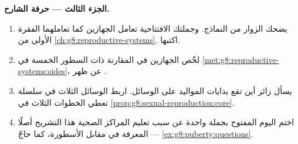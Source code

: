 \begin{problem}
\medskip\noindent\textbf{الجزء الثالث --- حرفة
الشارح.}
\begin{enumerate}[resume]
  \item يضحك الزوار من النماذج. وجملتك الافتتاحية تعامل
        الجهازين كما تعاملهما الفقرة الأولى من
        \cref{ch:g8:reproductive-systems}. اكتبها.
  \item لخّص الجهازين في المقارنة ذات السطور الخمسة في
        \cref{met:g8:reproductive-systems:sides}، عن ظهر
        .
  \item يسأل زائر أين تقع بدايات المواليد على الوسائل.
        اربط الوسائل الثلاث في سلسلة تعطي الخطوات الثلاث
        في \cref{prop:g8:sexual-reproduction:core}.
  \item اختم اليوم المفتوح بجملة واحدة عن سبب تعليم
        المراكز الصحية هذا التشريح أصلًا --- المعرفة في
        مقابل الأسطورة، كما حاجّ \cref{ex:g8:puberty:questions}.
\end{enumerate}
\end{problem}
